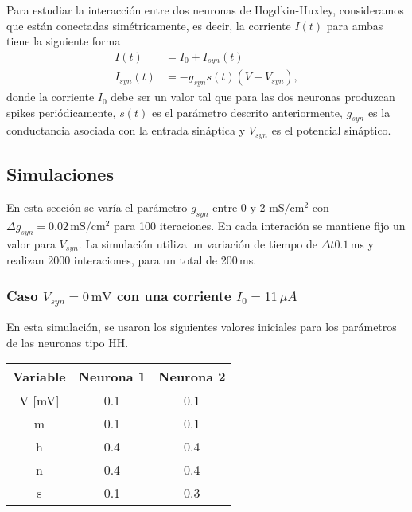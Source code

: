 Para estudiar la interacción entre dos neuronas de Hogdkin-Huxley, consideramos que están conectadas simétricamente, es decir, la corriente $I(t)$ para ambas tiene la siguiente forma
\begin{align}
    I(t)            &= I_0 + I_{syn}(t)\\
    I_{syn}(t)      &= -g_{syn}s(t)(V-V_{syn}),
\end{align}
donde la corriente $I_0$ debe ser un valor tal que para las dos neuronas produzcan spikes periódicamente, $s(t)$ es el parámetro descrito anteriormente, $g_{syn}$ es la conductancia asociada con la entrada sináptica y $V_{syn}$ es el potencial sináptico.

\subsection{Simulaciones}

En esta sección se varía el parámetro $g_{syn}$ entre $0$ y 2 ${\text{mS}}/{\text{cm}^2}$ con $\Delta g_{syn}=0.02\,{\text{mS}}/{\text{cm}^2}$ para 100 iteraciones. En cada interación se mantiene fijo un valor para $V_{syn}$. La simulación utiliza un variación de tiempo de $\Delta t 0.1\,$ms y realizan $2000$ interaciones, para un total de 200\,ms.

    \subsubsection{Caso $V_{syn}= 0\,\text{mV}$ con una corriente $I_0 = 11\,\mu A$}

    En esta simulación, se usaron los siguientes valores iniciales para los parámetros de las neuronas tipo HH.
    \begin{table}[H]
    \centering
    \begin{tabular}{c| c| c}
    {\bf Variable }& {\bf Neurona 1} & { \bf Neurona 2} \\ \hline
        V [mV]     & 0.1             & 0.1               \\  \hline
        m          & 0.1             & 0.1              \\  \hline
        h          & 0.4             & 0.4               \\  \hline
        n          & 0.4             & 0.4               \\  \hline
        s          & 0.1             & 0.3               \\  \hline
    
    \end{tabular}
    
    \end{table}

